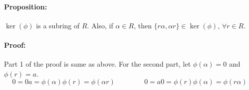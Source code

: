 \documentclass[12pt, oneside]{book}
\begin{document}
\paragraph{Proposition:} \(\ker(\phi)\) is a subring of \(R\).
Also, if \(\alpha \in R\), then \(\{r \alpha, \alpha r\} \in \ker(\phi)\), \(\forall r \in R\).
\paragraph{Proof:} Part 1 of the proof is same as above.
For the second part, let \(\phi(\alpha) = 0\) and \(\phi(r) = a\).
\[0 = 0 a = \phi(\alpha)\phi(r) = \phi(\alpha r) \hspace{50pt} 0 = a0 = \phi(r) \phi(\alpha) = \phi(r \alpha)\]
\end{document}
